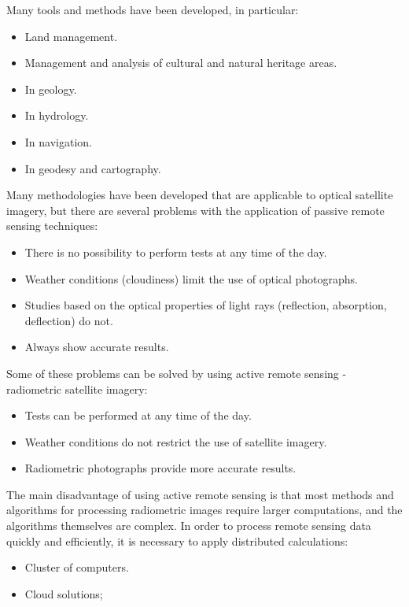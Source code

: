 {{{	Many tools and methods have been developed, in particular:
	
	\begin{itemize}
		\item Land management.
		\item Management and analysis of cultural and natural heritage areas.
		\item In geology.
		\item In hydrology.
		\item In navigation.
		\item In geodesy and cartography.
	\end{itemize}

	Many methodologies have been developed that are applicable to optical satellite imagery, but there are several problems with the application of passive remote sensing techniques:
	
	\begin{itemize}
		\item There is no possibility to perform tests at any time of the day.
		\item Weather conditions (cloudiness) limit the use of optical photographs.
		\item Studies based on the optical properties of light rays (reflection, absorption, deflection) do not. \item Always show accurate results.
	\end{itemize}

	Some of these problems can be solved by using active remote sensing - radiometric satellite imagery:
	
	\begin{itemize}
		\item Tests can be performed at any time of the day.
		\item Weather conditions do not restrict the use of satellite imagery.
		\item Radiometric photographs provide more accurate results.
	\end{itemize}

	The main disadvantage of using active remote sensing is that most methods and algorithms for processing radiometric images require larger computations, and the algorithms themselves are complex.
	In order to process remote sensing data quickly and efficiently, it is necessary to apply distributed calculations:
	
	\begin{itemize}
		\item Cluster of computers.
		\item Cloud solutions;
	\end{itemize}
	
}}}
